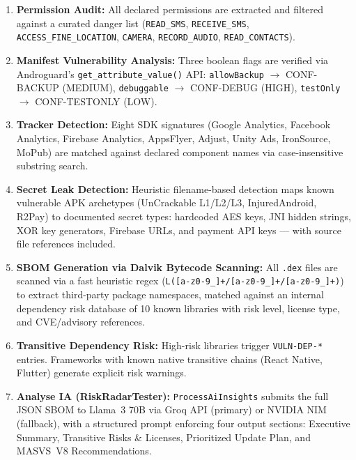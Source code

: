 \documentclass[3p,times]{elsarticle}
\begin{document}
\begin{enumerate}
  \item \textbf{Permission Audit:} All declared permissions are extracted and
  filtered against a curated danger list (\texttt{READ\_SMS},
  \texttt{RECEIVE\_SMS}, \texttt{ACCESS\_FINE\_LOCATION}, \texttt{CAMERA},
  \texttt{RECORD\_AUDIO}, \texttt{READ\_CONTACTS}).

  \item \textbf{Manifest Vulnerability Analysis:} Three boolean flags are
  verified via Androguard's \texttt{get\_attribute\_value()} API:
  \texttt{allowBackup} $\to$ CONF-BACKUP (MEDIUM),
  \texttt{debuggable} $\to$ CONF-DEBUG (HIGH),
  \texttt{testOnly} $\to$ CONF-TESTONLY (LOW).

  \item \textbf{Tracker Detection:} Eight SDK signatures (Google Analytics,
  Facebook Analytics, Firebase Analytics, AppsFlyer, Adjust, Unity Ads,
  IronSource, MoPub) are matched against declared component names via
  case-insensitive substring search.

  \item \textbf{Secret Leak Detection:} Heuristic filename-based detection
  maps known vulnerable APK archetypes (UnCrackable L1/L2/L3,
  InjuredAndroid, R2Pay) to documented secret types: hardcoded AES keys,
  JNI hidden strings, XOR key generators, Firebase URLs, and payment API
  keys — with source file references included.

  \item \textbf{SBOM Generation via Dalvik Bytecode Scanning:}
  All \texttt{.dex} files are scanned via a fast heuristic regex
  (\texttt{L([a-z0-9\_]+/[a-z0-9\_]+/[a-z0-9\_]+)}) to extract
  third-party package namespaces, matched against an internal dependency
  risk database of 10 known libraries with risk level, license type,
  and CVE/advisory references.

  \item \textbf{Transitive Dependency Risk:} High-risk libraries trigger
  \texttt{VULN-DEP-*} entries. Frameworks with known native transitive
  chains (React Native, Flutter) generate explicit risk warnings.

  \item \textbf{Analyse IA (RiskRadarTester):}
  \texttt{ProcessAiInsights} submits the full JSON SBOM to Llama~3 70B
  via Groq API (primary) or NVIDIA NIM (fallback), with a structured
  prompt enforcing four output sections: Executive Summary,
  Transitive Risks \& Licenses, Prioritized Update Plan, and
  MASVS~V8 Recommendations.
\end{enumerate}
\end{document}
